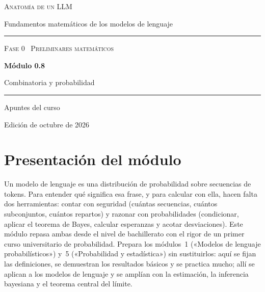 \documentclass[11pt,a4paper,twoside,openany]{book}
\begin{document}
\frontmatter
\begin{titlepage}
\centering
\vspace*{2.5cm}
{\large\scshape Anatomía de un LLM}\par
\vspace{0.4cm}
{\normalsize Fundamentos matemáticos de los modelos de lenguaje}\par
\vspace{2.2cm}
\rule{\textwidth}{0.8pt}\par\vspace{0.5cm}
{\small\scshape Fase 0 \textperiodcentered\ Preliminares matemáticos}\par\vspace{0.3cm}
{\Huge\bfseries Módulo 0.8\par}\vspace{0.3cm}
{\LARGE Combinatoria y probabilidad\par}
\vspace{0.5cm}\rule{\textwidth}{0.4pt}\par
\vspace{1.6cm}
{\large Apuntes del curso}\par
\vfill
{\small Edición de octubre de 2026}\par
\end{titlepage}

\chapter*{Presentación del módulo}

Un modelo de lenguaje es una distribución de probabilidad sobre secuencias de tokens. Para entender qué significa esa frase, y para calcular con ella, hacen falta dos herramientas: contar con seguridad (cuántas secuencias, cuántos subconjuntos, cuántos repartos) y razonar con probabilidades (condicionar, aplicar el teorema de Bayes, calcular esperanzas y acotar desviaciones). Este módulo repasa ambas desde el nivel de bachillerato con el rigor de un primer curso universitario de probabilidad. Prepara los módulos~1 («Modelos de lenguaje probabilísticos») y~5 («Probabilidad y estadística») sin sustituirlos: aquí se fijan las definiciones, se demuestran los resultados básicos y se practica mucho; allí se aplican a los modelos de lenguaje y se amplían con la estimación, la inferencia bayesiana y el teorema central del límite.
\end{document}
